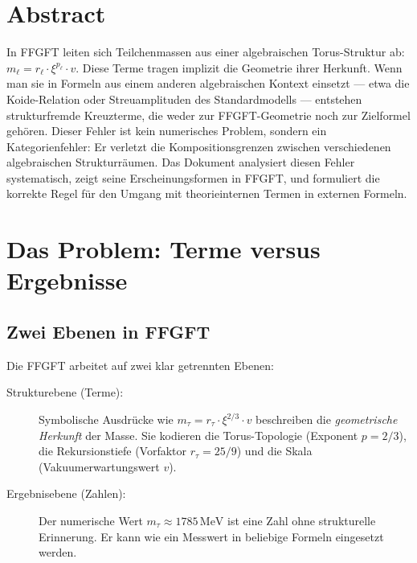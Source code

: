 
\section*{Abstract}

In FFGFT leiten sich Teilchenmassen aus einer algebraischen Torus-Struktur ab:
$m_\ell = r_\ell \cdot \xi^{p_\ell} \cdot v$. Diese Terme tragen implizit die
Geometrie ihrer Herkunft. Wenn man sie in Formeln aus einem anderen algebraischen
Kontext einsetzt — etwa die Koide-Relation oder Streuamplituden des Standardmodells
— entstehen strukturfremde Kreuzterme, die weder zur FFGFT-Geometrie noch zur
Zielformel gehören. Dieser Fehler ist kein numerisches Problem, sondern ein
Kategorienfehler: Er verletzt die Kompositionsgrenzen zwischen verschiedenen
algebraischen Strukturräumen. Das Dokument analysiert diesen Fehler systematisch,
zeigt seine Erscheinungsformen in FFGFT, und formuliert die korrekte Regel für
den Umgang mit theorieinternen Termen in externen Formeln.

\section{Das Problem: Terme versus Ergebnisse}

\subsection{Zwei Ebenen in FFGFT}

Die FFGFT arbeitet auf zwei klar getrennten Ebenen:

\begin{description}
  \item[Strukturebene (Terme):] Symbolische Ausdrücke wie
    $m_\tau = r_\tau \cdot \xi^{2/3} \cdot v$ beschreiben die
    \emph{geometrische Herkunft} der Masse. Sie kodieren die
    Torus-Topologie (Exponent $p = 2/3$), die Rekursionstiefe
    (Vorfaktor $r_\tau = 25/9$) und die Skala (Vakuumerwartungswert $v$).
  \item[Ergebnisebene (Zahlen):] Der numerische Wert
    $m_\tau \approx 1785\,\text{MeV}$ ist eine Zahl ohne strukturelle
    Erinnerung. Er kann wie ein Messwert in beliebige Formeln eingesetzt werden.
\end{description}

